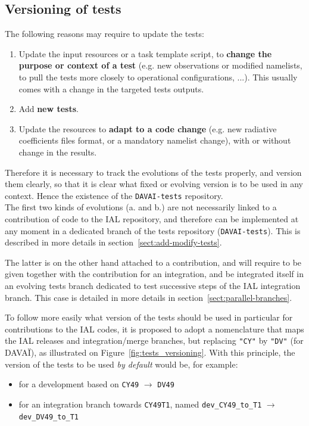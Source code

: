 \documentclass[a4paper,10pt,twoside]{article}
\begin{document}
\newpage
\begin{appendix}


\section{Versioning of tests\label{sect:tests_versioning}}

The following reasons may require to update the tests:
\begin{enumerate}[label=\alph*.]
 \item Update the input resources or a task template script, to \textbf{change the purpose or context of a test} (e.g. new observations or modified namelists, to pull the tests more closely to operational configurations, ...). This usually comes with a change in the targeted tests outputs.
 \item Add \textbf{new tests}.
 \item Update the resources to \textbf{adapt to a code change} (e.g. new radiative coefficients files format, or a mandatory namelist change), with or without change in the results.
\end{enumerate}

Therefore it is necessary to track the evolutions of the tests properly, and version them clearly, so that it is clear what fixed or evolving version is to be used in any context. Hence the existence of the \texttt{DAVAI-tests} repository.\\

The first two kinds of evolutions (a. and b.) are not necessarily linked to a contribution of code to the IAL repository, and therefore can be implemented at any moment in a dedicated branch of the tests repository (\texttt{DAVAI-tests}). This is described in more details in section~\ref{sect:add-modify-tests}.

The latter is on the other hand attached to a contribution, and will require to be given together with the contribution for an integration, and be integrated itself in an evolving tests branch dedicated to test successive steps of the IAL integration branch. This case is detailed in more details in section~\ref{sect:parallel-branches}.

To follow more easily what version of the tests should be used in particular for contributions to the IAL codes, it is proposed to adopt a nomenclature that maps the IAL releases and integration/merge branches, but replacing \texttt{"CY"} by \texttt{"DV"} (for DAVAÏ), as illustrated on Figure~\ref{fig:tests_versioning}.
With this principle, the version of the tests to be used \textit{by default} would be, for example:
\begin{itemize}
 \item for a development based on \texttt{CY49} $\rightarrow$ \texttt{DV49}
 \item for an integration branch towards \texttt{CY49T1}, named \texttt{dev\_CY49\_to\_T1} $\rightarrow$ \texttt{dev\_DV49\_to\_T1}
\end{itemize}



\end{appendix}
\end{document}
